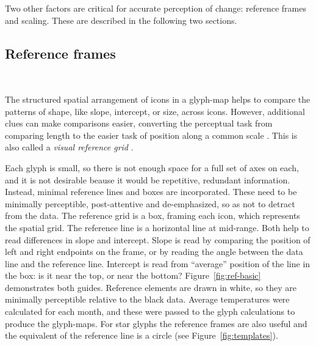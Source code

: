 \documentclass[oneside]{article}
\begin{document}
Two other factors are critical for accurate perception of change: reference frames and scaling. These are described in the following two sections.

\subsection{Reference frames}~\label{sec:reference}

The structured spatial arrangement of icons in a glyph-map helps to compare the patterns of shape, like slope, intercept, or size, across icons. However, additional clues can make comparisons easier, converting the perceptual task from comparing length to the easier task of position along a common scale \citep{cleveland:1984}. This is also called a \emph{visual reference grid} \citep{cleveland:1993a}.

Each glyph is small, so there is not enough space for a full set of axes on each, and it is not desirable beause it would be repetitive, redundant information. Instead, minimal reference lines and boxes are incorporated. These need to be minimally perceptible, post-attentive \citep{healey} and de-emphasized, so as not to detract from the data. The reference grid is a box, framing each icon, which represents the spatial grid. The reference line is a horizontal line at mid-range. Both help to read differences in slope and intercept. Slope is read by comparing the position of left and right endpoints on the frame, or by reading the angle between the data line and the reference line. Intercept is read from ``average'' position of the line in the box: is it near the top, or near the bottom? Figure~\ref{fig:ref-basic} demonstrates both guides. Reference elements are drawn in white, so they are minimally perceptible relative to the black data. Average temperatures were calculated for each month, and these were passed to the glyph calculations to produce the glyph-maps.   For star glyphs the reference frames are also useful and the equivalent of the reference line is a circle (see Figure~\ref{fig:templates}).

\end{document}
